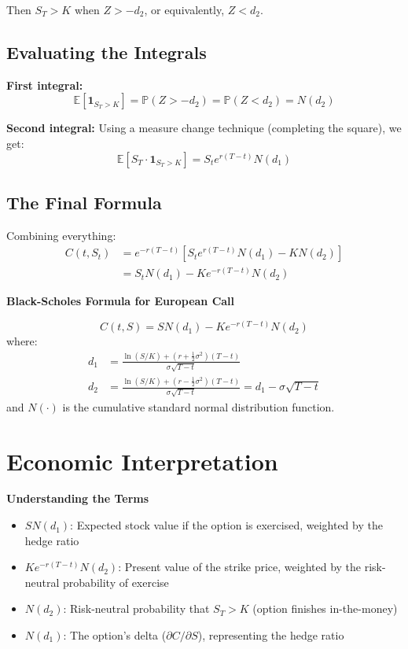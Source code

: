 \documentclass[11pt,a4paper]{article}
\newenvironment{keybox}[1][Key Result]
{\begin{leftbar}\noindent\textbf{\color{theoremblue}#1}\par\vspace{0.5em}}
{\end{leftbar}}
\newenvironment{examplebox}[1][Example]
{\begin{leftbar}\noindent\textbf{\color{examplegreen}#1}\par\vspace{0.5em}}
{\end{leftbar}}
\begin{document}
Then $S_T > K$ when $Z > -d_2$, or equivalently, $Z < d_2$.

\subsection{Evaluating the Integrals}

\textbf{First integral:}
\begin{equation}
\mathbb{E}[\mathbf{1}_{S_T > K}] = \mathbb{P}(Z > -d_2) = \mathbb{P}(Z < d_2) = N(d_2)
\end{equation}

\textbf{Second integral:} Using a measure change technique (completing the square), we get:
\begin{equation}
\mathbb{E}[S_T \cdot \mathbf{1}_{S_T > K}] = S_t e^{r(T-t)} N(d_1)
\end{equation}

\subsection{The Final Formula}

Combining everything:
\begin{align}
C(t,S_t) &= e^{-r(T-t)}[S_t e^{r(T-t)} N(d_1) - K N(d_2)]\\
&= S_t N(d_1) - Ke^{-r(T-t)} N(d_2)
\end{align}

\begin{keybox}[Black-Scholes Formula for European Call]
\begin{equation}
\boxed{C(t,S) = S N(d_1) - Ke^{-r(T-t)} N(d_2)}
\end{equation}
where:
\begin{align}
d_1 &= \frac{\ln(S/K) + (r + \frac{1}{2}\sigma^2)(T-t)}{\sigma\sqrt{T-t}}\\
d_2 &= \frac{\ln(S/K) + (r - \frac{1}{2}\sigma^2)(T-t)}{\sigma\sqrt{T-t}} = d_1 - \sigma\sqrt{T-t}
\end{align}
and $N(\cdot)$ is the cumulative standard normal distribution function.
\end{keybox}

\section{Economic Interpretation}

\begin{examplebox}[Understanding the Terms]
\begin{itemize}
    \item \textbf{$S N(d_1)$}: Expected stock value if the option is exercised, weighted by the hedge ratio
    \item \textbf{$Ke^{-r(T-t)} N(d_2)$}: Present value of the strike price, weighted by the risk-neutral probability of exercise
    \item \textbf{$N(d_2)$}: Risk-neutral probability that $S_T > K$ (option finishes in-the-money)
    \item \textbf{$N(d_1)$}: The option's delta ($\partial C/\partial S$), representing the hedge ratio
\end{itemize}
\end{examplebox}
\end{document}
